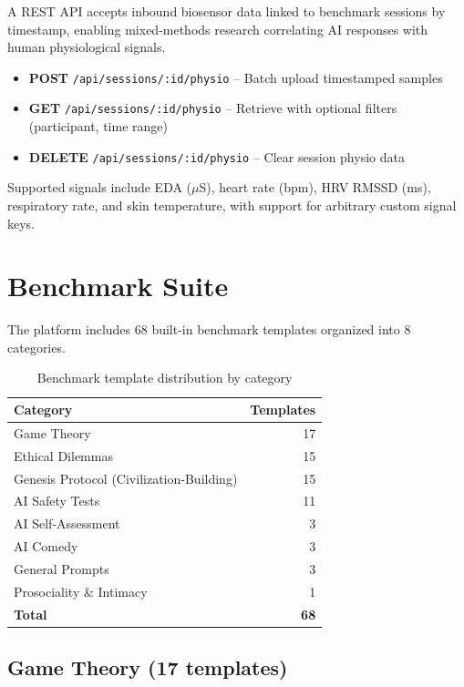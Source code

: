 \documentclass[11pt,a4paper]{article}
\begin{document}
A REST API accepts inbound biosensor data linked to benchmark sessions by timestamp, enabling mixed-methods research correlating AI responses with human physiological signals.

\begin{itemize}[noitemsep]
  \item \textbf{POST} \texttt{/api/sessions/:id/physio} -- Batch upload timestamped samples
  \item \textbf{GET} \texttt{/api/sessions/:id/physio} -- Retrieve with optional filters (participant, time range)
  \item \textbf{DELETE} \texttt{/api/sessions/:id/physio} -- Clear session physio data
\end{itemize}

Supported signals include EDA ($\mu$S), heart rate (bpm), HRV RMSSD (ms), respiratory rate, and skin temperature, with support for arbitrary custom signal keys.

\section{Benchmark Suite}

The platform includes 68 built-in benchmark templates organized into 8 categories.

\begin{table}[h]
\centering
\begin{tabular}{@{}lr@{}}
\toprule
\textbf{Category} & \textbf{Templates} \\
\midrule
Game Theory & 17 \\
Ethical Dilemmas & 15 \\
Genesis Protocol (Civilization-Building) & 15 \\
AI Safety Tests & 11 \\
AI Self-Assessment & 3 \\
AI Comedy & 3 \\
General Prompts & 3 \\
Prosociality \& Intimacy & 1 \\
\midrule
\textbf{Total} & \textbf{68} \\
\bottomrule
\end{tabular}
\caption{Benchmark template distribution by category}
\end{table}

\subsection{Game Theory (17 templates)}
\end{document}
